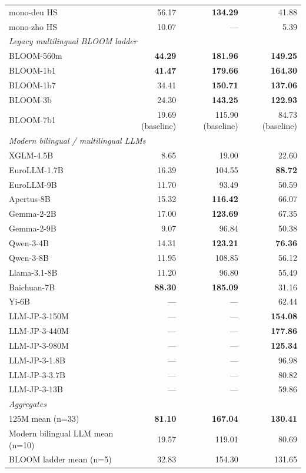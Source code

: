\begin{table}[!ht]
\begin{tabular}{lrrr}
    mono-deu HS           & 56.17 & \textbf{134.29} & 41.88 \\
    mono-zho HS           & 10.07 & --- & 5.39 \\
    \midrule
    \multicolumn{4}{l}{\textit{Legacy multilingual BLOOM ladder}} \\
    \midrule
    BLOOM-560m            & \textbf{44.29} & \textbf{181.96} & \textbf{149.25} \\
    BLOOM-1b1             & \textbf{41.47} & \textbf{179.66} & \textbf{164.30} \\
    BLOOM-1b7             & 34.41 & \textbf{150.71} & \textbf{137.06} \\
    BLOOM-3b              & 24.30 & \textbf{143.25} & \textbf{122.93} \\
    BLOOM-7b1             & 19.69 (baseline) & 115.90 (baseline) & 84.73 (baseline) \\
    \midrule
    \multicolumn{4}{l}{\textit{Modern bilingual / multilingual LLMs}} \\
    \midrule
    XGLM-4.5B             & 8.65 & 19.00 & 22.60 \\
    EuroLLM-1.7B          & 16.39 & 104.55 & \textbf{88.72} \\
    EuroLLM-9B            & 11.70 & 93.49 & 50.59 \\
    Apertus-8B            & 15.32 & \textbf{116.42} & 66.07 \\
    Gemma-2-2B            & 17.00 & \textbf{123.69} & 67.35 \\
    Gemma-2-9B            & 9.07 & 96.84 & 50.38 \\
    Qwen-3-4B             & 14.31 & \textbf{123.21} & \textbf{76.36} \\
    Qwen-3-8B             & 11.95 & 108.85 & 56.12 \\
    Llama-3.1-8B          & 11.20 & 96.80 & 55.49 \\
    Baichuan-7B           & \textbf{88.30} & \textbf{185.09} & 31.16 \\
    Yi-6B                 & --- & --- & 62.44 \\
    LLM-JP-3-150M         & --- & --- & \textbf{154.08} \\
    LLM-JP-3-440M         & --- & --- & \textbf{177.86} \\
    LLM-JP-3-980M         & --- & --- & \textbf{125.34} \\
    LLM-JP-3-1.8B         & --- & --- & 96.98 \\
    LLM-JP-3-3.7B         & --- & --- & 80.82 \\
    LLM-JP-3-13B          & --- & --- & 59.86 \\
    \midrule
    \multicolumn{4}{l}{\textit{Aggregates}} \\
    \midrule
    \beetle{} 125M mean (n=33)        & \textbf{81.10} & \textbf{167.04} & \textbf{130.41} \\
    Modern bilingual LLM mean (n=10)  & 19.57 & 119.01 & 80.69 \\
    BLOOM ladder mean (n=5)           & 32.83 & 154.30 & 131.65 \\
    \bottomrule
  \end{tabular}
\end{table}

